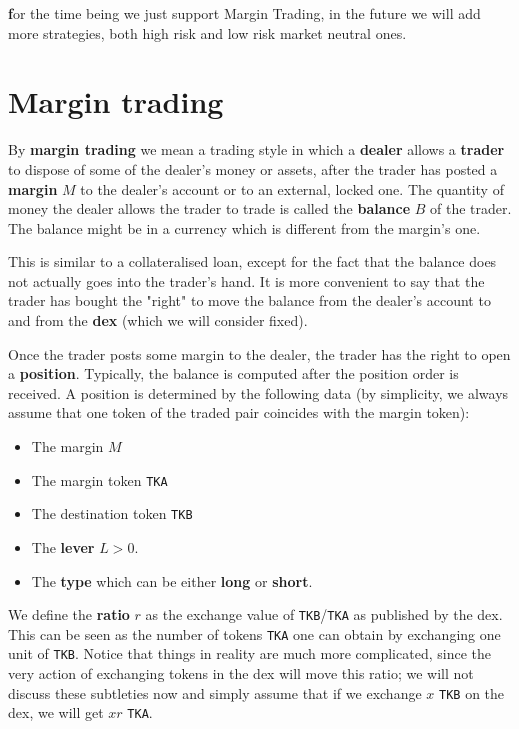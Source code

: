 \documentclass[a4paper,10 pt]{article}
\theoremstyle{definition}
\begin{document}
{\textbf for the time being we just support Margin Trading, in the future we will add more strategies, both high risk and low risk market neutral ones.}

\section{Margin trading}

By \textbf{margin trading} we mean a trading style in which a \textbf{dealer} allows a \textbf{trader} to dispose of some of the dealer's money or assets, after the trader has posted a \textbf{margin} $M$ to the dealer's account or to an external, locked one. The quantity of money the dealer allows the trader to trade is called the \textbf{balance} $B$ of the trader. The balance might be in a currency which is different from the margin's one.

This is similar to a collateralised loan, except for the fact that the balance does not actually goes into the trader's hand. It is more convenient to say that the trader has bought the "right" to move the balance from the dealer's account to and from the \textbf{dex} (which we will consider fixed).

Once the trader posts some margin to the dealer, the trader has the right to open a \textbf{position}. Typically, the balance is computed after the position order is received. A position is determined by the following data (by simplicity, we always assume that one token of the traded pair coincides with the margin token):
\begin{itemize}
\item The margin $M$
\item The margin token \verb|TKA|
\item The destination token \verb|TKB|
\item The \textbf{lever} $L > 0$.
\item The \textbf{type} which can be either \textbf{long} or \textbf{short}.
\end{itemize}

We define the \textbf{ratio} $r$ as the exchange value of \verb|TKB|/\verb|TKA| as published by the dex. This can be seen as the number of tokens \verb|TKA| one can obtain by exchanging one unit of \verb|TKB|. Notice that things in reality are much more complicated, since the very action of exchanging tokens in the dex will move this ratio; we will not discuss these subtleties now and simply assume that if we exchange $x$ \verb|TKB| on the dex, we will get $xr$ \verb|TKA|.
\end{document}
